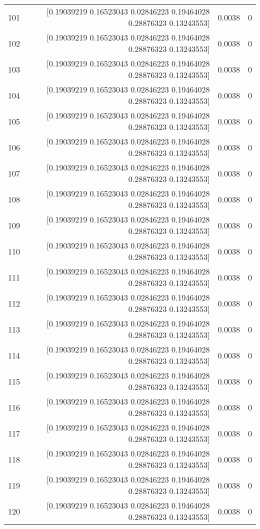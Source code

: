 \begin{longtable}{lrrr}
101 & [0.19039219 0.16523043 0.02846223 0.19464028 0.28876323 0.13243553] & 0.0038 & 0 \\
102 & [0.19039219 0.16523043 0.02846223 0.19464028 0.28876323 0.13243553] & 0.0038 & 0 \\
103 & [0.19039219 0.16523043 0.02846223 0.19464028 0.28876323 0.13243553] & 0.0038 & 0 \\
104 & [0.19039219 0.16523043 0.02846223 0.19464028 0.28876323 0.13243553] & 0.0038 & 0 \\
105 & [0.19039219 0.16523043 0.02846223 0.19464028 0.28876323 0.13243553] & 0.0038 & 0 \\
106 & [0.19039219 0.16523043 0.02846223 0.19464028 0.28876323 0.13243553] & 0.0038 & 0 \\
107 & [0.19039219 0.16523043 0.02846223 0.19464028 0.28876323 0.13243553] & 0.0038 & 0 \\
108 & [0.19039219 0.16523043 0.02846223 0.19464028 0.28876323 0.13243553] & 0.0038 & 0 \\
109 & [0.19039219 0.16523043 0.02846223 0.19464028 0.28876323 0.13243553] & 0.0038 & 0 \\
110 & [0.19039219 0.16523043 0.02846223 0.19464028 0.28876323 0.13243553] & 0.0038 & 0 \\
111 & [0.19039219 0.16523043 0.02846223 0.19464028 0.28876323 0.13243553] & 0.0038 & 0 \\
112 & [0.19039219 0.16523043 0.02846223 0.19464028 0.28876323 0.13243553] & 0.0038 & 0 \\
113 & [0.19039219 0.16523043 0.02846223 0.19464028 0.28876323 0.13243553] & 0.0038 & 0 \\
114 & [0.19039219 0.16523043 0.02846223 0.19464028 0.28876323 0.13243553] & 0.0038 & 0 \\
115 & [0.19039219 0.16523043 0.02846223 0.19464028 0.28876323 0.13243553] & 0.0038 & 0 \\
116 & [0.19039219 0.16523043 0.02846223 0.19464028 0.28876323 0.13243553] & 0.0038 & 0 \\
117 & [0.19039219 0.16523043 0.02846223 0.19464028 0.28876323 0.13243553] & 0.0038 & 0 \\
118 & [0.19039219 0.16523043 0.02846223 0.19464028 0.28876323 0.13243553] & 0.0038 & 0 \\
119 & [0.19039219 0.16523043 0.02846223 0.19464028 0.28876323 0.13243553] & 0.0038 & 0 \\
120 & [0.19039219 0.16523043 0.02846223 0.19464028 0.28876323 0.13243553] & 0.0038 & 0 \\

\end{longtable}
